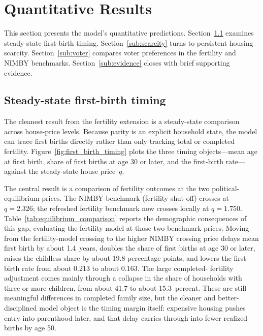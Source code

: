 
\section{Quantitative Results}
\label{sec:quantitative_results}

This section presents the model's quantitative predictions. Section~\ref{sub:timing}
examines steady-state first-birth timing. Section~\ref{sub:scarcity} turns to persistent
housing scarcity. Section~\ref{sub:voter} compares voter preferences in the fertility and
NIMBY benchmarks. Section~\ref{sub:evidence} closes with brief supporting evidence.

\subsection{Steady-state first-birth timing}
\label{sub:timing}

The cleanest result from the fertility extension is a steady-state comparison across
house-price levels. Because parity is an explicit household state, the model can trace
first births directly rather than only tracking total or completed fertility.
Figure~\ref{fig:first_birth_timing} plots the three timing objects---mean age at first
birth, share of first births at age 30 or later, and the first-birth rate---against the
steady-state house price~$q$.

The central result is a comparison of fertility outcomes at the two political-equilibrium
prices. The NIMBY benchmark (fertility shut off) crosses at $q = 2.326$; the refreshed
fertility benchmark now crosses locally at $q = 1.750$. Table~\ref{tab:equilibrium_comparison}
reports the demographic consequences of this gap, evaluating the fertility model at those
two benchmark prices. Moving from the fertility-model crossing to the higher NIMBY
crossing price delays mean first birth by about 1.4~years, doubles the share of first
births at age 30 or later, raises the childless share by about 19.8 percentage points,
and lowers the first-birth rate from about 0.213 to about 0.163. The large completed-
fertility adjustment comes mainly through a collapse in the share of households with three
or more children, from about 41.7 to about 15.3~percent. These are still meaningful
differences in completed family size, but the cleaner and better-disciplined model object
is the timing margin itself: expensive housing pushes entry into parenthood later, and
that delay carries through into fewer realized births by age 50.

